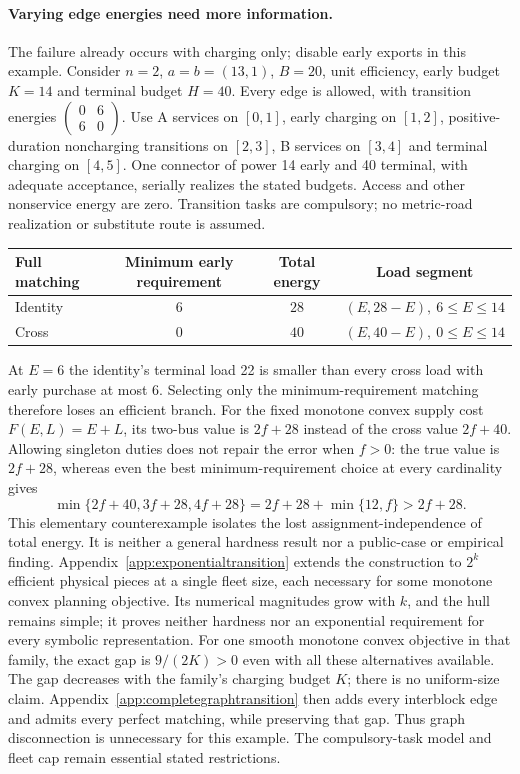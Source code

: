\paragraph{Varying edge energies need more information.}
The failure already occurs with charging only; disable early exports in
this example. Consider $n=2$, $a=b=(13,1)$, $B=20$, unit efficiency, early budget $K=14$
and terminal budget $H=40$. Every edge is allowed, with transition energies
$\left(\begin{smallmatrix}0&6\\6&0\end{smallmatrix}\right)$.
Use A services on $[0,1]$, early charging on $[1,2]$, positive-duration
noncharging transitions on $[2,3]$, B services on $[3,4]$ and terminal
charging on $[4,5]$. One connector of power 14 early and 40 terminal,
with adequate acceptance, serially realizes the stated budgets. Access and
other nonservice energy are zero. Transition tasks are compulsory; no
metric-road realization or substitute route is assumed.
\begin{center}
\begin{tabular}{lccc}
\toprule
Full matching & Minimum early requirement & Total energy & Load segment\\
\midrule
Identity & $6$ & $28$ & $(E,28-E),\ 6\le E\le14$\\
Cross & $0$ & $40$ & $(E,40-E),\ 0\le E\le14$\\
\bottomrule
\end{tabular}
\end{center}
At $E=6$ the identity's terminal load 22 is smaller than every cross load
with early purchase at most 6. Selecting only the minimum-requirement
matching therefore loses an efficient branch. For the fixed monotone
convex supply cost $F(E,L)=E+L$, its two-bus value is $2f+28$ instead of
the cross value $2f+40$. Allowing singleton duties does not repair the
error when $f>0$: the true value is $2f+28$, whereas even the best
minimum-requirement choice at every cardinality gives
\[
 \min\{2f+40,3f+28,4f+28\}
 =2f+28+\min\{12,f\}>2f+28.
\]
This elementary counterexample isolates the lost assignment-independence
of total energy. It is neither a general hardness result nor a public-case
or empirical finding.
Appendix~\ref{app:exponentialtransition} extends the construction to
$2^k$ efficient physical pieces at a single fleet size, each necessary for
some monotone convex planning objective. Its numerical magnitudes grow
with $k$, and the hull remains simple; it proves neither hardness nor an
exponential requirement for every symbolic representation.
For one smooth monotone convex objective in that family, the exact gap is
$9/(2K)>0$ even with all these alternatives available. The gap decreases
with the family's charging budget $K$; there is no uniform-size claim.
Appendix~\ref{app:completegraphtransition} then adds every interblock edge
and admits every perfect matching, while preserving that gap. Thus graph
disconnection is unnecessary for this example. The compulsory-task model
and fleet cap remain essential stated restrictions.

